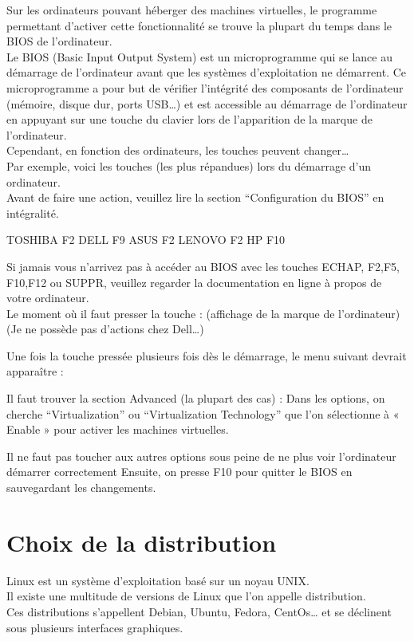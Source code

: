 Sur les ordinateurs pouvant héberger des machines virtuelles, le programme permettant 
d’activer cette fonctionnalité se trouve la plupart du temps dans le BIOS de l’ordinateur.\\

Le BIOS (Basic Input Output System) est un microprogramme qui se lance au démarrage de l’ordinateur 
avant que les systèmes d’exploitation ne démarrent. Ce microprogramme a pour but de vérifier 
l’intégrité des composants de l’ordinateur (mémoire, disque dur, ports USB…) et est accessible au 
démarrage de l’ordinateur en appuyant sur une touche du clavier lors de l’apparition de la marque 
de l’ordinateur.\\

Cependant, en fonction des ordinateurs, les touches peuvent changer…\\
Par exemple, voici les touches (les plus répandues) lors du démarrage d’un ordinateur.\\
Avant de faire une action, veuillez lire la section “Configuration du BIOS” en intégralité.

TOSHIBA
F2
DELL
F9
ASUS
F2
LENOVO
F2
HP
F10


Si jamais vous n’arrivez pas à accéder au BIOS avec les touches ECHAP, F2,F5, F10,F12 ou SUPPR, 
veuillez regarder la documentation en ligne à propos de votre ordinateur.\\


Le moment où il faut presser la touche :
(affichage de la marque de l’ordinateur)
(Je ne possède pas d’actions chez Dell…)

Une fois la touche pressée plusieurs fois dès le démarrage, le menu suivant devrait apparaître :

Il faut trouver la section Advanced (la plupart des cas) :
Dans les options, on cherche “Virtualization” ou “Virtualization Technology” que l’on sélectionne à « Enable » pour activer les machines virtuelles.

Il ne faut pas toucher aux autres options sous peine de ne plus voir l’ordinateur démarrer correctement
Ensuite, on presse F10 pour quitter le BIOS en sauvegardant les changements.


\section{Choix de la distribution}

Linux est un système d’exploitation basé sur un noyau UNIX.\\
Il existe une multitude de versions de Linux que l’on appelle distribution.\\
Ces distributions s’appellent Debian, Ubuntu, Fedora, CentOs… et se déclinent sous plusieurs 
interfaces graphiques.\\

